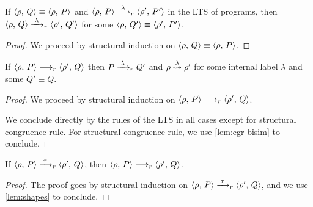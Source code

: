 \begin{lemma}\label{lem:cgr-bisim}
If $\langle \rho ,\, Q \rangle \equiv \langle \rho ,\, P \rangle$ and $\langle \rho ,\, P \rangle \xrightarrow{\;\lambda\;}_{r} \langle \rho' ,\, P' \rangle$ in the LTS of programs, then
$\langle \rho ,\, Q \rangle \xrightarrow{\;\lambda\;}_{r} \langle \rho' ,\, Q' \rangle$ for some $\langle \rho ,\, Q' \rangle \equiv \langle \rho' ,\, P' \rangle$.
\end{lemma}
\begin{proof}
  We proceed by structural induction on $\langle \rho ,\, Q \rangle \equiv \langle \rho ,\, P \rangle$.
\end{proof}

\begin{lemma}\label{lem:red-int}
If $\langle \rho ,\, P \rangle \longrightarrow_{r} \langle \rho' ,\, Q \rangle$ then $P \xrightarrow{\;\lambda\;}_{r} Q'$ and
$\rho \mathrel{\stackrel{\lambda}{\rightsquigarrow}} \rho'$ for some internal label $\lambda$ and some
$Q' \equiv Q$.
\end{lemma}

\begin{proof}
  We proceed by structural induction on $\langle \rho ,\, P \rangle \longrightarrow_{r} \langle \rho' ,\, Q \rangle$.

  We conclude directly by the rules of the LTS in all cases except for structural congruence rule.
  For structural congruence rule, we use \cref{lem:cgr-bisim} to conclude.
\end{proof}

\begin{lemma}\label{lem:int-red}
If $\langle \rho ,\, P \rangle \xrightarrow{\;\tau\;}_{r} \langle \rho' ,\, Q \rangle$, then $\langle \rho ,\, P \rangle \longrightarrow_{r} \langle \rho' ,\, Q \rangle$.
\end{lemma}

\begin{proof}
  The proof goes by structural induction on $\langle \rho ,\, P \rangle \xrightarrow{\;\tau\;}_{r} \langle \rho' ,\, Q \rangle$, and we use \cref{lem:shapes} to conclude.
\end{proof}